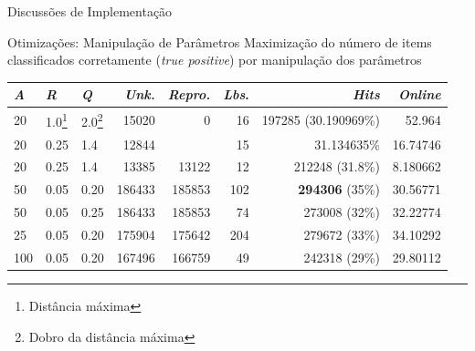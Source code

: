 \documentclass[aspectratio=43,10pt]{beamer}
\begin{document}
\begin{frame}[fragile]{Discussões de Implementação}
  \begin{alertblock}{Otimizações: Manipulação de Parâmetros}
    Maximização do número de items classificados corretamente (\textit{true positive}) por manipulação dos parâmetros
    \footnotesize{
      \begin{tabular}
      {l          | l           | l           || r            | r               | r             | r                      | r                }
      \textit{A}  & \textit{R}  & \textit{Q}  & \textit{Unk.} & \textit{Repro.} & \textit{Lbs}. & \textit{Hits}          & \textit{Online}  \\\hline\hline
      20          & 1.0\footnote{Distância máxima}        & 2.0\footnote{Dobro da distância máxima}        & 15020         & 0               & 16            & 197285 (30.190969\%)   & 52.964           \\\hline\hline
      20          & 0.25        & 1.4         & 12844         &                 & 15            & 31.134635\%            & 16.74746         \\\hline
      20          & 0.25        & 1.4         & 13385         & 13122           & 12            & 212248 (31.8\%)        & 8.180662         \\\hline
      50          & 0.05        & 0.20        & 186433        & 185853          & 102           & \textbf{294306} (35\%) & 30.56771         \\\hline
      50          & 0.05        & 0.25        & 186433        & 185853          & 74            & 273008 (32\%)          & 32.22774         \\\hline
      25          & 0.05        & 0.20        & 175904        & 175642          & 204           & 279672 (33\%)          & 34.10292         \\\hline
      100         & 0.05        & 0.20        & 167496        & 166759          & 49            & 242318 (29\%)          & 29.80112         \\
      \end{tabular}}
  \end{alertblock}
\end{frame}
\end{document}
